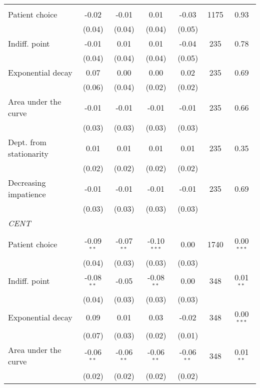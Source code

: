 \begin{table}[htbp]
{\begin{threeparttable}
\begin{tabular}{l*{6}{c}}
          &         &         &         &         &         &         \\
Patient choice&    -0.02&    -0.01&     0.01&    -0.03&     1175&     0.93\\
          &   (0.04)&   (0.04)&   (0.04)&   (0.05)&         &         \\
Indiff. point&    -0.01&     0.01&     0.01&    -0.04&      235&     0.78\\
          &   (0.04)&   (0.04)&   (0.04)&   (0.05)&         &         \\
Exponential decay&     0.07&     0.00&     0.00&     0.02&      235&     0.69\\
          &   (0.06)&   (0.04)&   (0.02)&   (0.02)&         &         \\
Area under the curve&    -0.01&    -0.01&    -0.01&    -0.01&      235&     0.66\\
          &   (0.03)&   (0.03)&   (0.03)&   (0.03)&         &         \\
Dept. from stationarity&     0.01&     0.01&     0.01&     0.01&      235&     0.35\\
          &   (0.02)&   (0.02)&   (0.02)&   (0.02)&         &         \\
Decreasing impatience&    -0.01&    -0.01&    -0.01&    -0.01&      235&     0.69\\
          &   (0.03)&   (0.03)&   (0.03)&   (0.03)&         &         \\
\textit{CENT}&         &         &         &         &         &         \\
          &         &         &         &         &         &         \\
Patient choice&-0.09$^{**}$&-0.07$^{**}$&-0.10$^{***}$&     0.00&     1740&0.00$^{***}$\\
          &   (0.04)&   (0.03)&   (0.03)&   (0.03)&         &         \\
Indiff. point&-0.08$^{**}$&    -0.05&-0.08$^{**}$&     0.00&      348&0.01$^{**}$\\
          &   (0.04)&   (0.03)&   (0.03)&   (0.03)&         &         \\
Exponential decay&     0.09&     0.01&     0.03&    -0.02&      348&0.00$^{***}$\\
          &   (0.07)&   (0.03)&   (0.02)&   (0.01)&         &         \\
Area under the curve&-0.06$^{**}$&-0.06$^{**}$&-0.06$^{**}$&-0.06$^{**}$&      348&0.01$^{**}$\\
          &   (0.02)&   (0.02)&   (0.02)&   (0.02)&         &         \\

\end{tabular}
\end{threeparttable}}
\end{table}
